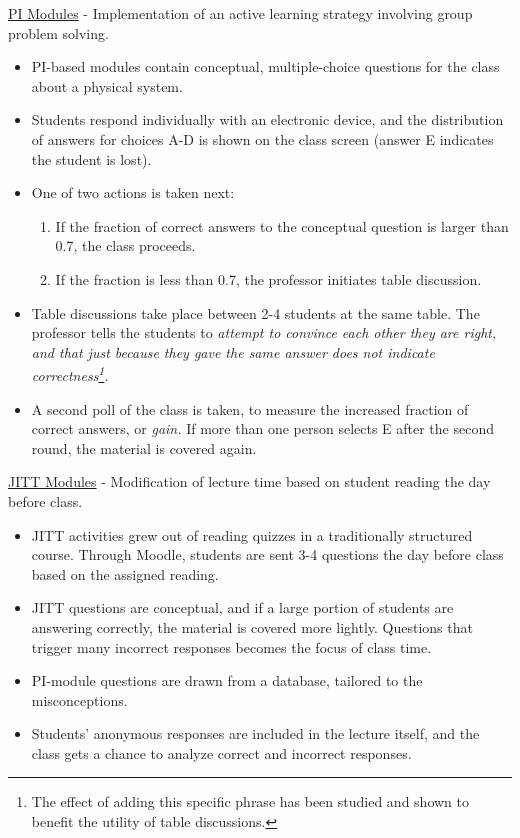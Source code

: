 \documentclass[../../../main.tex]{subfiles}
\begin{document}
\underline{PI Modules} - Implementation of an active learning strategy involving group problem solving.
\begin{itemize}
\item PI-based modules contain conceptual, multiple-choice questions for the class about a physical system.  
\item Students respond individually with an electronic device, and the distribution of answers for choices A-D is shown on the class screen (answer E indicates the student is lost).
\item One of two actions is taken next:
\begin{enumerate}
\item If the fraction of correct answers to the conceptual question is larger than 0.7, the class proceeds.
\item If the fraction is less than 0.7, the professor initiates table discussion.
\end{enumerate}
\item Table discussions take place between 2-4 students at the same table.  The professor tells the students to \textit{attempt to convince each other they are right, and that just because they gave the same answer does not indicate correctness\footnote{The effect of adding this specific phrase has been studied and shown to benefit the utility of table discussions.}.}
\item A second poll of the class is taken, to measure the increased fraction of correct answers, or \textit{gain.}  If more than one person selects E after the second round, the material is covered again.
\end{itemize}

\underline{JITT Modules} - Modification of lecture time based on student reading the day before class.
\begin{itemize}
\item JITT activities grew out of reading quizzes in a traditionally structured course.  Through Moodle, students are sent 3-4 questions the day before class based on the assigned reading.
\item JITT questions are conceptual, and if a large portion of students are answering correctly, the material is covered more lightly.  Questions that trigger many incorrect responses becomes the focus of class time.
\item PI-module questions are drawn from a database, tailored to the misconceptions.
\item Students' anonymous responses are included in the lecture itself, and the class gets a chance to analyze correct and incorrect responses.
\end{itemize}
\end{document}
